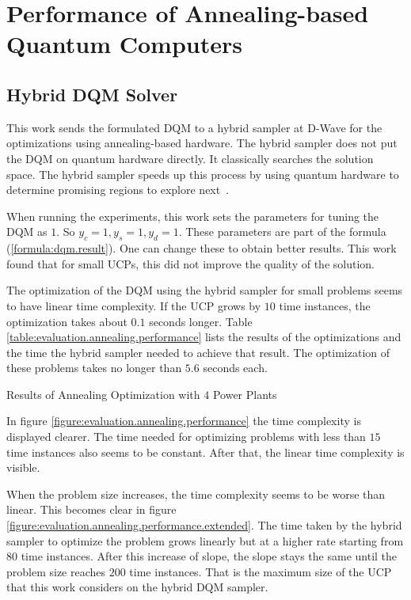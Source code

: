 \section{Performance of Annealing-based Quantum Computers}

\subsection{Hybrid DQM Solver}

This work sends the formulated DQM to a hybrid sampler at D-Wave for the optimizations using annealing-based hardware.
The hybrid sampler does not put the DQM on quantum hardware directly.
It classically searches the solution space.
The hybrid sampler speeds up this process by using quantum hardware to determine promising regions to explore next~\cite{DQMHybrid2020}.

When running the experiments, this work sets the parameters for tuning the DQM as $1$.
So $y_c = 1, y_s = 1, y_d = 1$.
These parameters are part of the formula (\ref{formula:dqm.result}).
One can change these to obtain better results.
This work found that for small UCPs, this did not improve the quality of the solution.

The optimization of the DQM using the hybrid sampler for small problems seems to have linear time complexity.
If the UCP grows by $10$ time instances, the optimization takes about $0.1$ seconds longer.
Table \ref{table:evaluation.annealing.performance} lists the results of the optimizations and the time the hybrid sampler needed to achieve that result.
The optimization of these problems takes no longer than $5.6$ seconds each.

\begin{table}[ht]
  \centering
  
  \caption{Results of Annealing Optimization with $4$ Power Plants}
  \label{table:evaluation.annealing.performance}
\end{table}

In figure \ref{figure:evaluation.annealing.performance} the time complexity is displayed clearer.
The time needed for optimizing problems with less than $15$ time instances also seems to be constant.
After that, the linear time complexity is visible.

When the problem size increases, the time complexity seems to be worse than linear.
This becomes clear in figure \ref{figure:evaluation.annealing.performance.extended}.
The time taken by the hybrid sampler to optimize the problem grows linearly but at a higher rate starting from $80$ time instances.
After this increase of slope, the slope stays the same until the problem size reaches $200$ time instances.
That is the maximum size of the UCP that this work considers on the hybrid DQM sampler.

